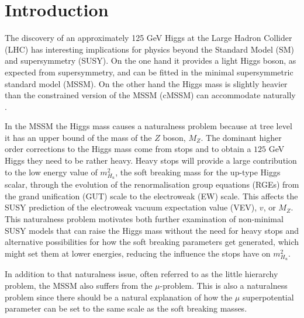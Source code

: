 \documentclass[preprint,amsmath,amssymb,aps,superscriptaddress,prd,showpacs,floatfix,nofootinbib]{revtex4-1}
\begin{document}
\maketitle

\section{\label{sec:intro}Introduction}
The discovery of an approximately 125 GeV Higgs
\cite{Aad:2012tfa,Chatrchyan:2012ufa} at the Large Hadron Collider
(LHC) has interesting implications for physics beyond the Standard
Model (SM) and supersymmetry (SUSY).  On the one hand it provides a
light Higgs boson, as expected from supersymmetry, and
can be fitted in the minimal supersymmetric standard model (MSSM).  On
the other hand the Higgs mass is slightly heavier than the constrained version of the 
MSSM (cMSSM) can accommodate naturally \cite{Cassel:2011zd,Ghilencea:2012gz}.

In the MSSM the Higgs mass causes a naturalness problem because at
tree level it has an upper bound of the mass of the $Z$ boson,
$M_Z$. The dominant higher order corrections to the Higgs mass come
from stops and to obtain a $125$ GeV Higgs they need to be rather
heavy. Heavy stops will provide a large contribution to the low energy
value of $m_{H_u}^2$, the soft breaking mass for the up-type Higgs
scalar, through the evolution of the renormalisation group equations
(RGEs) from the grand unification (GUT) scale to the electroweak (EW)
scale. This affects the SUSY prediction of the electroweak vacuum expectation value (VEV), $v$,
or $M_Z$.  This naturalness problem motivates both further examination
of non-minimal SUSY models that can raise the Higgs mass without the
need for heavy stops and alternative possibilities for how the soft
breaking parameters get generated, which might set them at lower
energies, reducing the influence the stops have on $m_{H_u}^2$.

In addition to that naturalness issue, often referred to as the little
hierarchy problem, the MSSM also suffers from the $\mu$-problem. This
is also a naturalness problem since there should be a natural explanation
of how the $\mu$ superpotential parameter can be set to the same scale
as the soft breaking masses.
\end{document}
